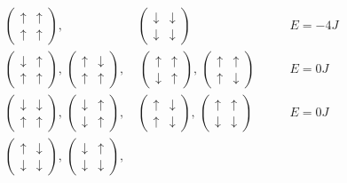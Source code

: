 \begin{align*}
    \begin{pmatrix} \uparrow & \uparrow \\ \uparrow & \uparrow \end{pmatrix},&
    \begin{pmatrix} \downarrow & \downarrow \\ \downarrow & \downarrow \end{pmatrix} \qquad \qquad &E = -4J \\
    \begin{pmatrix} \downarrow & \uparrow \\ \uparrow & \uparrow \end{pmatrix}, \,
    \begin{pmatrix} \uparrow & \downarrow \\ \uparrow & \uparrow \end{pmatrix},& \,
    \begin{pmatrix} \uparrow & \uparrow \\ \downarrow & \uparrow \end{pmatrix}, \,
    \begin{pmatrix} \uparrow & \uparrow \\ \uparrow & \downarrow \end{pmatrix} \qquad &E = 0J \\
    \begin{pmatrix} \downarrow & \downarrow \\ \uparrow & \uparrow \end{pmatrix}, \,
    \begin{pmatrix} \downarrow & \uparrow \\ \downarrow & \uparrow \end{pmatrix}, \, &
    \begin{pmatrix} \uparrow & \downarrow \\ \uparrow & \downarrow \end{pmatrix}, \,
    \begin{pmatrix} \uparrow & \uparrow \\ \downarrow & \downarrow \end{pmatrix} \qquad &E = 0J \\
    \begin{pmatrix} \uparrow & \downarrow \\ \downarrow & \downarrow \end{pmatrix}, \,
    \begin{pmatrix} \downarrow & \uparrow \\ \downarrow & \downarrow \end{pmatrix}, \,&

\end{align*}
